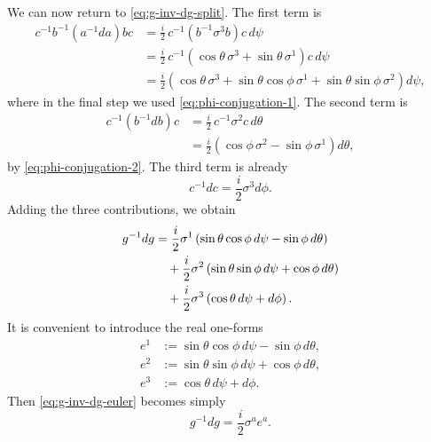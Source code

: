 \documentclass[11pt]{article}
\theoremstyle{definition}
\numberwithin{theorem}{section}
\numberwithin{equation}{section}
\begin{document}
\noindent We can now return to \eqref{eq:g-inv-dg-split}. The first term is
\begin{align*}
c^{-1}b^{-1}(a^{-1}da)bc
&=
\frac{i}{2}\,c^{-1}\left(b^{-1}\sigma^3 b\right)c\, d\psi \\
&=
\frac{i}{2}\,c^{-1}\left(\cos\theta\,\sigma^3 + \sin\theta\,\sigma^1\right)c\, d\psi \\
&=
\frac{i}{2}\left(\cos\theta\,\sigma^3 + \sin\theta\cos\phi\,\sigma^1 + \sin\theta\sin\phi\,\sigma^2\right)d\psi,
\end{align*}
where in the final step we used \eqref{eq:phi-conjugation-1}. The second term is
\begin{align*}
c^{-1}(b^{-1}db)c
&=
\frac{i}{2}\,c^{-1}\sigma^2 c\, d\theta \\
&=
\frac{i}{2}\left(\cos\phi\,\sigma^2 - \sin\phi\,\sigma^1\right)d\theta,
\end{align*}
by \eqref{eq:phi-conjugation-2}. The third term is already
\begin{equation*}
c^{-1}dc = \frac{i}{2}\sigma^3 d\phi.
\end{equation*}
Adding the three contributions, we obtain
\begin{align}
g^{-1}dg
&=
\frac{i}{2}\sigma^1\left(\sin\theta\cos\phi\,d\psi - \sin\phi\,d\theta\right) \notag\\
&\quad+
\frac{i}{2}\sigma^2\left(\sin\theta\sin\phi\,d\psi + \cos\phi\,d\theta\right) \notag\\
&\quad+
\frac{i}{2}\sigma^3\left(\cos\theta\,d\psi + d\phi\right).
\label{eq:g-inv-dg-euler}
\end{align}
It is convenient to introduce the real one-forms
\begin{align}
e^1 &:= \sin\theta\cos\phi\,d\psi - \sin\phi\,d\theta,
\label{eq:e1-form}\\
e^2 &:= \sin\theta\sin\phi\,d\psi + \cos\phi\,d\theta,
\label{eq:e2-form}\\
e^3 &:= \cos\theta\,d\psi + d\phi.
\label{eq:e3-form}
\end{align}
Then \eqref{eq:g-inv-dg-euler} becomes simply
\begin{equation}\label{eq:g-inv-dg-frame}
g^{-1}dg = \frac{i}{2}\sigma^a e^a.
\end{equation}

\medskip
\end{document}

